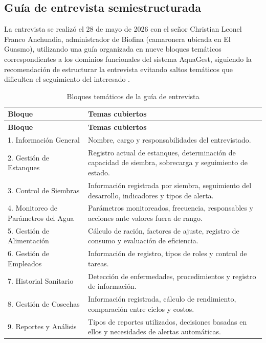 \documentclass[12pt,a4paper]{article}
\begin{document}
\subsection{Guía de entrevista semiestructurada}

La entrevista se realizó el 28 de mayo de 2026 con el señor Christian Leonel
Franco Anchundia, administrador de Biofina (camaronera ubicada en El Guasmo),
utilizando una guía organizada en nueve bloques temáticos correspondientes a
los dominios funcionales del sistema AquaGest, siguiendo la recomendación de
estructurar la entrevista evitando saltos temáticos que dificulten el
seguimiento del interesado \cite{Pohl2010,IREB2023}.

\begin{longtable}{|p{3.6cm}|p{9.4cm}|}
\caption{Bloques temáticos de la guía de entrevista} \\
\hline
\textbf{Bloque} & \textbf{Temas cubiertos} \\
\hline
\endfirsthead
\hline
\textbf{Bloque} & \textbf{Temas cubiertos} \\
\hline
\endhead
1. Información General & Nombre, cargo y responsabilidades del entrevistado. \\ \hline
2. Gestión de Estanques & Registro actual de estanques, determinación de capacidad de siembra, sobrecarga y seguimiento de estado. \\ \hline
3. Control de Siembras & Información registrada por siembra, seguimiento del desarrollo, indicadores y tipos de alerta. \\ \hline
4. Monitoreo de Parámetros del Agua & Parámetros monitoreados, frecuencia, responsables y acciones ante valores fuera de rango. \\ \hline
5. Gestión de Alimentación & Cálculo de ración, factores de ajuste, registro de consumo y evaluación de eficiencia. \\ \hline
6. Gestión de Empleados & Información de registro, tipos de roles y control de tareas. \\ \hline
7. Historial Sanitario & Detección de enfermedades, procedimientos y registro de información. \\ \hline
8. Gestión de Cosechas & Información registrada, cálculo de rendimiento, comparación entre ciclos y costos. \\ \hline
9. Reportes y Análisis & Tipos de reportes utilizados, decisiones basadas en ellos y necesidades de alertas automáticas. \\ \hline
\end{longtable}
\end{document}

